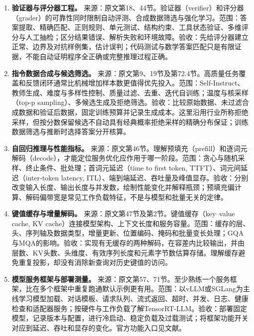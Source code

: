 \documentclass[UTF8,12pt,a4paper,fontset=fandol]{ctexart}
\begin{document}
\begin{enumerate}[label=\arabic*.,series=techrank]
\item \textbf{验证器与评分器工程。}\label{tech:grader}
来源：原文第18、44节。验证器（verifier）和评分器（grader）的可靠性同时限制自动评测、合成数据筛选与强化学习。范围：答案提取、精确匹配、正则规则、单元测试、结构约束、工具状态验证、多维评分与人工抽检；区分结果错误、解析失败和环境故障。验收：先给评分器建立正常、边界及对抗样例集，估计误判；代码测试与数学答案匹配只是有限证据，不能自动证明程序全正确或完整推理过程正确。

\item \textbf{指令数据合成与候选筛选。}\label{tech:synthetic}
来源：原文第9、19节及第72.4节。高质量任务覆盖和反馈闭环通常比机械增加样本数更值得优先投入。范围：Self-Instruct、教师生成、难度与多样性控制、质量过滤、去重、迭代自训练；温度与核采样（top-p sampling）、多候选生成及拒绝筛选。验收：比较原始数据、未过滤合成数据和验证后数据，固定训练预算并记录生成成本。这里沿用行业所称拒绝采样，但按分数保留候选不自动具有经典概率拒绝采样的精确分布保证；训练数据筛选与推断时选择答案分开核算。

\item \textbf{自回归推理与性能指标。}\label{tech:inference}
来源：原文第46节。理解预填充（prefill）和逐词元解码（decode），才能定位服务优化应作用于哪一阶段。范围：贪心与随机采样、终止条件、批处理；首词元延迟（time to first token, TTFT）、词元间延迟（inter-token latency, ITL）、端到端延迟、吞吐量及峰值显存。验收：分别改变输入长度、输出长度与并发数，绘制性能变化并解释瓶颈；预填充偏计算、解码偏带宽是常见工作负载特征，不是与模型和批量无关的定律。

\item \textbf{键值缓存与增量解码。}\label{tech:kv}
来源：原文第47节及第2节。键值缓存（key--value cache, KV cache）连接模型架构、上下文长度和服务容量。范围：缓存的层、头、序列轴及数据类型，增量更新、位置编码、掩码和批量变长处理；GQA与MQA的影响。验收：实现有无缓存的两种解码，在容差内比较输出，并由层数、KV头数、头维度、有效序列长度和元素字节数估算存储。理解缓存避免重复投影，却没有消除新查询对历史键值的访问。

\item \textbf{模型服务框架与部署测量。}\label{tech:serving}
来源：原文第57、71节。至少熟练一个服务框架，比在多个框架中重复跑通默认示例更有用。范围：以vLLM或SGLang为主线学习模型加载、对话模板、请求队列、流式返回、超时、并发、日志、健康检查和适配器服务；按硬件与工作负载了解TensorRT-LLM。验收：部署固定模型，记录版本与配置，进行冷启动、稳定负载及过载测试；将框架功能开关对应到延迟、吞吐和显存的变化。官方功能入口见文献\cite{vllmfeatures}。


\end{enumerate}
\end{document}
